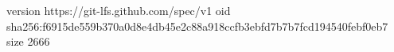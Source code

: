 version https://git-lfs.github.com/spec/v1
oid sha256:f6915de559b370a0d8e4db45e2c88a918ccfb3ebfd7b7b7fcd194540febf0eb7
size 2666
